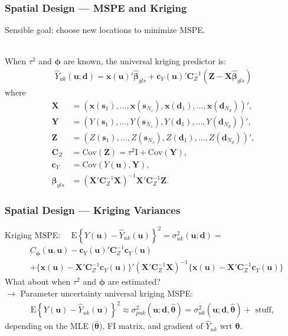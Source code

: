 \documentclass[xcolor=dvipsnames]{beamer}
\begin{document}
\begin{frame}
\frametitle{Spatial Design --- MSPE and Kriging}
Sensible goal: choose new locations to minimize MSPE. \\~\\

\pause

When $\tau^2$ and $\bm{\phi}$ are known, the universal kriging predictor is:
\begin{align*}
\widehat{Y}_{uk}(\bm{u}; \bm{d}) = \bm{x}(\bm{u})'\widehat{\bm{\beta}}_{gls} + \bm{c}_Y(\bm{u})'\bm{C}_Z^{-1}(\bm{Z} - \bm{X}\widehat{\bm{\beta}}_{gls})
\end{align*}
\citep{cressie2011statistics} where
\begin{align*}
\bm{X} &= (\bm{x}(\bm{s}_1), \dots, \bm{x}(\bm{s}_{N_s}), \bm{x}(\bm{d}_1), \dots, \bm{x}(\bm{d}_{N_d}))',\\
\bm{Y} &= (Y(\bm{s}_1), \dots, Y(\bm{s}_{N_s}), Y(\bm{d}_1), \dots, Y(\bm{d}_{N_d}))',\\
\bm{Z} &= (Z(\bm{s}_1), \dots, Z(\bm{s}_{N_s}), Z(\bm{d}_1), \dots, Z(\bm{d}_{N_d}))',\\
\bm{C}_Z &= \mathrm{Cov}(\bm{Z}) = \tau^2\bm{\mathrm{I}} + \mathrm{Cov}(\bm{Y}),\\
\bm{c}_Y &= \mathrm{Cov}(Y(\bm{u}), \bm{Y}),\\
\widehat{\bm{\beta}}_{gls} &= (\bm{X}'\bm{C}_Z^{-1}\bm{X})^{-1}\bm{X}'\bm{C}_Z^{-1}\bm{Z}.
\end{align*}
\end{frame}

\begin{frame}
\frametitle{Spatial Design --- Kriging Variances}
Kriging MSPE: \ \ $\mathrm{E}\left\{Y(\bm{u}) - \widehat{Y}_{uk}(\bm{u})\right\}^2 = \sigma_{uk}^2(\bm{u};\bm{d})=$
\begin{align*}
&C_{\bm{\phi}}(\bm{u}, \bm{u}) - \bm{c}_Y(\bm{u})'\bm{C}_Z^{-1}\bm{c}_Y(\bm{u})\\
& + \{\bm{x}(\bm{u})  - \bm{X}'\bm{C}_Z^{-1}\bm{c}_Y(\bm{u})\}'(\bm{X}'\bm{C}_Z^{-1}\bm{X})^{-1}\{\bm{x}(\bm{u})  - \bm{X}'\bm{C}_Z^{-1}\bm{c}_Y(\bm{u})\}
\end{align*}
\pause
What about when $\tau^2$ and $\bm{\phi}$ are estimated? \pause\\
$\to$ Parameter uncertainty universal kriging MSPE:
\begin{align*}
\mathrm{E}\left\{Y(\bm{u}) - \widehat{Y}_{uk}(\bm{u})\right\}^2 \approx \sigma^2_{puk}(\bm{u};\bm{d},\widehat{\bm{\theta}}) = \sigma^2_{uk}(\bm{u};\bm{d},\widehat{\bm{\theta}}) + \mbox{ stuff, }
\end{align*}
depending on the MLE ($\widehat{\bm{\theta}}$), FI matrix, and gradient
of $\widehat{Y}_{uk}$ wrt $\bm{\theta}$.\\ \citep{zimmerman1992mean,abt1999estimating}
\end{frame}
\end{document}
